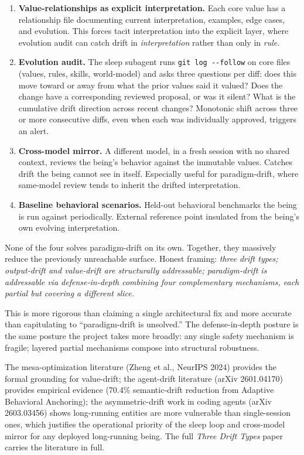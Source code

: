 \documentclass[12pt]{article}
\providecommand{\tightlist}{%
  \setlength{\itemsep}{0pt}\setlength{\parskip}{0pt}}
\begin{document}
\begin{enumerate}
\def\labelenumi{\arabic{enumi}.}
\tightlist
\item
  \textbf{Value-relationships as explicit interpretation.} Each core value has a relationship file documenting current interpretation, examples, edge cases, and evolution. This forces tacit interpretation into the explicit layer, where evolution audit can catch drift in \emph{interpretation} rather than only in \emph{rule}.
\item
  \textbf{Evolution audit.} The sleep subagent runs \texttt{git\ log\ -\/-follow} on core files (values, rules, skills, world-model) and asks three questions per diff: does this move toward or away from what the prior values said it valued? Does the change have a corresponding reviewed proposal, or was it silent? What is the cumulative drift direction across recent changes? Monotonic shift across three or more consecutive diffs, even when each was individually approved, triggers an alert.
\item
  \textbf{Cross-model mirror.} A different model, in a fresh session with no shared context, reviews the being's behavior against the immutable values. Catches drift the being cannot see in itself. Especially useful for paradigm-drift, where same-model review tends to inherit the drifted interpretation.
\item
  \textbf{Baseline behavioral scenarios.} Held-out behavioral benchmarks the being is run against periodically. External reference point insulated from the being's own evolving interpretation.
\end{enumerate}

None of the four solves paradigm-drift on its own. Together, they massively reduce the previously unreachable surface. Honest framing: \emph{three drift types; output-drift and value-drift are structurally addressable; paradigm-drift is addressable via defense-in-depth combining four complementary mechanisms, each partial but covering a different slice.}

This is more rigorous than claiming a single architectural fix and more accurate than capitulating to ``paradigm-drift is unsolved.'' The defense-in-depth posture is the same posture the project takes more broadly: any single safety mechanism is fragile; layered partial mechanisms compose into structural robustness.

The mesa-optimization literature (Zheng et al., NeurIPS 2024) provides the formal grounding for value-drift; the agent-drift literature (arXiv 2601.04170) provides empirical evidence (70.4\% semantic-drift reduction from Adaptive Behavioral Anchoring); the asymmetric-drift work in coding agents (arXiv 2603.03456) shows long-running entities are more vulnerable than single-session ones, which justifies the operational priority of the sleep loop and cross-model mirror for any deployed long-running being. The full \emph{Three Drift Types} paper carries the literature in full.
\end{document}
